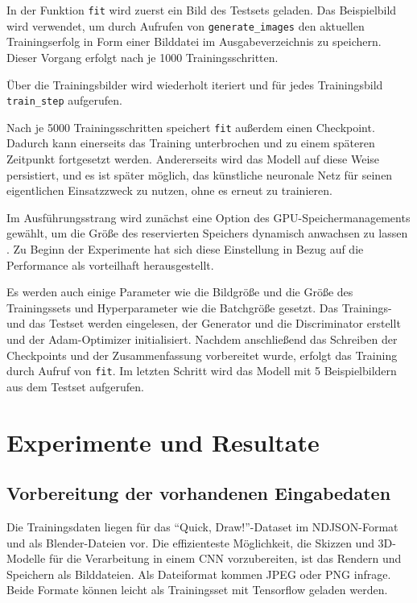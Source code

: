 In der Funktion \lstinline|fit| wird zuerst ein Bild des Testsets geladen. Das Beispielbild wird verwendet, um durch Aufrufen von \lstinline|generate_images| den aktuellen Trainingserfolg in Form einer Bilddatei im Ausgabeverzeichnis zu speichern. Dieser Vorgang erfolgt nach je 1000 Trainingsschritten.

Über die Trainingsbilder wird wiederholt iteriert und für jedes Trainingsbild \lstinline|train_step| aufgerufen.

Nach je 5000 Trainingsschritten speichert \lstinline|fit| außerdem einen Checkpoint. Dadurch kann einerseits das Training unterbrochen und zu einem späteren Zeitpunkt fortgesetzt werden. Andererseits wird das Modell auf diese Weise persistiert, und es ist später möglich, das künstliche neuronale Netz für seinen eigentlichen Einsatzzweck zu nutzen, ohne es erneut zu trainieren.

Im Ausführungsstrang wird zunächst eine Option des GPU-Speichermanagements gewählt, um die Größe des reservierten Speichers dynamisch anwachsen zu lassen \cite{zaccone2018tensorflow}. Zu Beginn der Experimente hat sich diese Einstellung in Bezug auf die Performance als vorteilhaft herausgestellt.

Es werden auch einige Parameter wie die Bildgröße und die Größe des Trainingssets und Hyperparameter wie die Batchgröße gesetzt. Das Trainings- und das Testset werden eingelesen, der Generator und die Discriminator erstellt und der Adam-Optimizer initialisiert. Nachdem anschließend das Schreiben der Checkpoints und der Zusammenfassung vorbereitet wurde, erfolgt das Training durch Aufruf von \lstinline|fit|. Im letzten Schritt wird das Modell mit 5 Beispielbildern aus dem Testset aufgerufen.

\chapter{Experimente und Resultate}
\label{ch:conduct}

\section{Vorbereitung der vorhandenen Eingabedaten}
\label{sec:preparation}
Die Trainingsdaten liegen für das ``Quick, Draw!''-Dataset im NDJSON-Format und als Blender-Dateien vor. Die effizienteste Möglichkeit, die Skizzen und 3D-Modelle für die Verarbeitung in einem CNN vorzubereiten, ist das Rendern und  Speichern als Bilddateien. Als Dateiformat kommen JPEG oder PNG infrage. Beide Formate können leicht als Trainingsset mit Tensorflow geladen werden.

